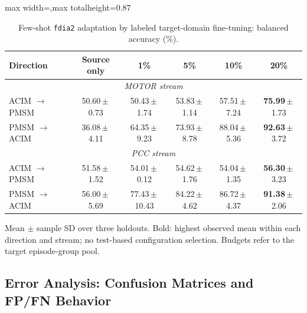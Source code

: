 \documentclass[letterpaper,journal]{IEEEtran}
\providecommand{\DIFaddbegin}{} %
\providecommand{\DIFaddend}{} %
\begin{document}
\begin{table}[p]
\begin{adjustbox}{max width=\textwidth,max totalheight=0.87\textheight}
\begin{minipage}{\textwidth}
\begin{minipage}[t]{\textwidth}
\centering
\footnotesize
\caption{Few-shot \texttt{fdia2} adaptation by labeled target-domain fine-tuning: balanced accuracy (\%).}
\label{tab:domain_adaptation_anomaly2}
\renewcommand{\arraystretch}{1.15}
\setlength{\tabcolsep}{6pt}
\begin{tabular}{@{}lccccc@{}}
\hline
Direction & Source only & 1\% & 5\% & 10\% & 20\% \\\hline
\hline\multicolumn{6}{c}{\textit{MOTOR stream}} \\\hline
ACIM $\to$ PMSM & \mbox{50.60\,$\pm$\,0.73} & \mbox{50.43\,$\pm$\,1.74} & \mbox{53.83\,$\pm$\,1.14} & \mbox{57.51\,$\pm$\,7.24} & \mbox{\textbf{75.99}\,$\pm$\,1.73} \\
PMSM $\to$ ACIM & \mbox{36.08\,$\pm$\,4.11} & \mbox{64.35\,$\pm$\,9.23} & \mbox{73.93\,$\pm$\,8.78} & \mbox{88.04\,$\pm$\,5.36} & \mbox{\textbf{92.63}\,$\pm$\,3.72} \\
\hline\multicolumn{6}{c}{\textit{PCC stream}} \\\hline
ACIM $\to$ PMSM & \mbox{51.58\,$\pm$\,1.52} & \mbox{54.01\,$\pm$\,0.12} & \mbox{54.62\,$\pm$\,1.76} & \mbox{54.04\,$\pm$\,1.35} & \mbox{\textbf{56.30}\,$\pm$\,3.23} \\
PMSM $\to$ ACIM & \mbox{56.00\,$\pm$\,5.69} & \mbox{77.43\,$\pm$\,10.43} & \mbox{84.22\,$\pm$\,4.62} & \mbox{86.72\,$\pm$\,4.37} & \mbox{\textbf{91.38}\,$\pm$\,2.06} \\
\hline\end{tabular}
\par\smallskip\begin{minipage}{\textwidth}\scriptsize Mean $\pm$ sample SD over three holdouts. Bold: highest observed mean within each direction and stream; no test-based configuration selection. Budgets refer to the target episode-group pool.\end{minipage}

\end{minipage}
\end{minipage}
\end{adjustbox}
\end{table}




\DIFaddend \subsection{Error Analysis: Confusion Matrices and FP/FN Behavior}
\label{sec:error_analysis}
\DIFaddbegin
\end{document}
